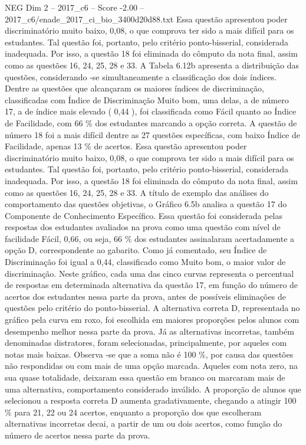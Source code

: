 \begin{textsample}{NEG Dim 2 – 2017\_c6 – Score -2.00 – 2017\_c6/enade\_2017\_ci\_bio\_3400d20d88.txt}
Essa questão apresentou poder discriminatório muito baixo, 0,08, o que comprova ter sido a mais difícil para os estudantes.
Tal questão foi, portanto, pelo critério ponto-bisserial, considerada inadequada.
Por isso, a questão 18 foi eliminada do cômputo da nota final, assim como as questões 16, 24, 25, 28 e 33.
A Tabela 6.12b apresenta a distribuição das questões, considerando -se simultaneamente a classificação dos dois índices.
Dentre as questões que alcançaram os maiores índices de discriminação, classificadas com Índice de Discriminação Muito bom, uma delas, a de número 17, a de índice mais elevado ( 0,44 ), foi classificada como Fácil quanto ao Índice de Facilidade, com 66 \% dos estudantes marcando a opção correta.
A questão de número 18 foi a mais difícil dentre as 27 questões específicas, com baixo Índice de Facilidade, apenas 13 \% de acertos.
Essa questão apresentou poder discriminatório muito baixo, 0,08, o que comprova ter sido a mais difícil para os estudantes.
Tal questão foi, portanto, pelo critério ponto-bisserial, considerada inadequada.
Por isso, a questão 18 foi eliminada do cômputo da nota final, assim como as questões 16, 24, 25, 28 e 33.
A título de exemplo das análises do comportamento das questões objetivas, o Gráfico 6.5b analisa a questão 17 do Componente de Conhecimento Específico.
Essa questão foi considerada pelas respostas dos estudantes avaliados na prova como uma questão com nível de facilidade Fácil, 0,66, ou seja, 66 \% dos estudantes assinalaram acertadamente a opção D, correspondente ao gabarito.
Como já comentado, seu Índice de Discriminação foi igual a 0,44, classificado como Muito bom, o maior valor de discriminação.
Neste gráfico, cada uma das cinco curvas representa o percentual de respostas em determinada alternativa da questão 17, em função do número de acertos dos estudantes nessa parte da prova, antes de possíveis eliminações de questões pelo critério do ponto-bisserial.
A alternativa correta D, representada no gráfico pela curva em roxo, foi escolhida em maiores proporções pelos alunos com desempenho melhor nessa parte da prova.
Já as alternativas incorretas, também denominadas distratores, foram selecionadas, principalmente, por aqueles com notas mais baixas.
Observa -se que a soma não é 100 \%, por causa das questões não respondidas ou com mais de uma opção marcada.
Aqueles com nota zero, na sua quase totalidade, deixaram essa questão em branco ou marcaram mais de uma alternativa, comportamento considerado inválido.
A proporção de alunos que selecionou a resposta correta D aumenta gradativamente, chegando a atingir 100 \% para 21, 22 ou 24 acertos, enquanto a proporção dos que escolheram alternativas incorretas decai, a partir de um ou dois acertos, como função do número de acertos nessa parte da prova.

\end{textsample}
